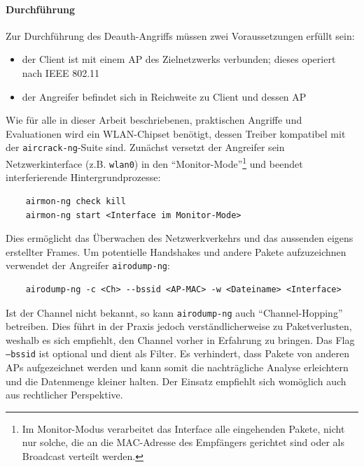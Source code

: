 \paragraph{Durchführung}
Zur Durchführung des Deauth-Angriffs müssen zwei Voraussetzungen erfüllt sein: 
\begin{itemize}
	\item der Client ist mit einem AP des Zielnetzwerks verbunden; dieses operiert nach IEEE 802.11
	\item der Angreifer befindet sich in Reichweite zu Client und dessen AP
\end{itemize}

Wie für alle in dieser Arbeit beschriebenen, praktischen Angriffe und Evaluationen wird ein WLAN-Chipset benötigt, dessen Treiber kompatibel mit der \texttt{aircrack-ng}-Suite sind. 
Zunächst versetzt der Angreifer sein Netzwerkinterface (z.B. \texttt{wlan0}) in den \enquote{Monitor-Mode}\footnote{Im Monitor-Modus verarbeitet das Interface alle eingehenden Pakete, nicht nur solche, die an die MAC-Adresse des Empfängers gerichtet sind oder als Broadcast verteilt werden.} und beendet interferierende Hintergrundprozesse:

\begin{Verbatim}
	airmon-ng check kill
	airmon-ng start <Interface im Monitor-Mode>
\end{Verbatim}

Dies ermöglicht das Überwachen des Netzwerkverkehrs und das aussenden eigens erstellter Frames.
Um potentielle Handshakes und andere Pakete aufzuzeichnen verwendet der Angreifer \texttt{airodump-ng}:
\begin{Verbatim}
	airodump-ng -c <Ch> --bssid <AP-MAC> -w <Dateiname> <Interface>
\end{Verbatim}
Ist der Channel nicht bekannt, so kann \texttt{airodump-ng} auch \enquote{Channel-Hopping} betreiben. 
Dies führt in der Praxis jedoch verständlicherweise zu Paketverlusten, weshalb es sich empfiehlt, den Channel vorher in Erfahrung zu bringen. Das Flag \texttt{--bssid} ist optional und dient als Filter. Es verhindert, dass Pakete von anderen APs aufgezeichnet werden und kann somit die nachträgliche Analyse erleichtern und die Datenmenge kleiner halten. Der Einsatz empfiehlt sich womöglich auch aus rechtlicher Perspektive.

